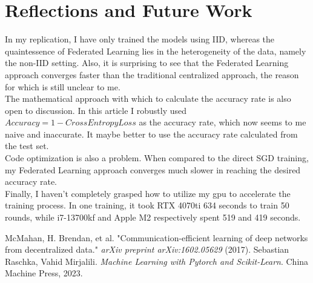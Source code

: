 \documentclass[a4paper,12pt]{article}
\begin{document}
\section{Reflections and Future Work}
In my replication, I have only trained the models using IID, whereas the quaintessence 
of Federated Learning lies in the heterogeneity of the data, namely the non-IID setting.
Also, it is surprising to see that the Federated Learning approach 
converges faster than the traditional centralized approach, the reason for which 
is still unclear to me.
\\
The mathematical approach with which to calculate the accuracy rate is also open to discussion.
In this article I robustly used $Accuracy = 1 - CrossEntropyLoss$ as the accuracy rate, which now seems to me 
naive and inaccurate. It maybe better to use the accuracy rate calculated from the test set. 
\\
Code optimization is also a problem. When compared to the direct SGD training, my 
Federated Learning approach converges much slower in reaching the desired accuracy rate.
\\
Finally, I haven't completely grasped how to utilize my gpu to accelerate the training process. In one 
training, it took RTX 4070ti 634 seconds to train 50 rounds, while i7-13700kf and Apple M2 respectively spent 519 and 419 seconds. 
{} %

\begin{thebibliography}{99}
     McMahan, H. Brendan, et al. "Communication-efficient learning of deep networks from decentralized data." \textit{arXiv preprint arXiv:1602.05629} (2017).
    \bibitem{} Sebastian Raschka, Vahid Mirjalili. \textit{Machine Learning with Pytorch and Scikit-Learn}. China Machine Press, 2023.
\end{thebibliography}






\appendix
\end{document}
